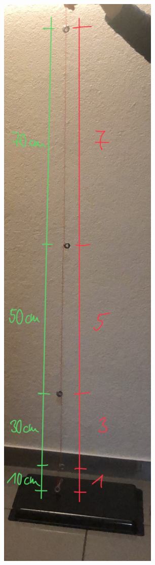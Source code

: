\documentclass[../main.tex]{subfiles}
\begin{document}
\begin{tcolorbox}
\begin{minipage}[]{0.2\textwidth}
        \includegraphics[width=1\textwidth]{img/versuchsaufbau}
    \end{minipage}


\end{tcolorbox}
\end{document}

